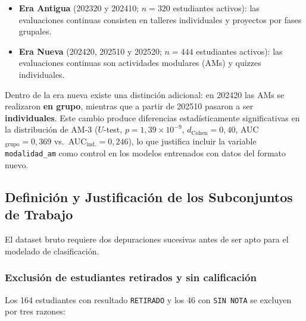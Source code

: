\begin{itemize}
  \item \textbf{Era Antigua} (202320 y 202410; $n = 320$ estudiantes
    activos): las evaluaciones continuas consisten en talleres
    individuales y proyectos por fases grupales.

  \item \textbf{Era Nueva} (202420, 202510 y 202520; $n = 444$
    estudiantes activos): las evaluaciones continuas son
    actividades modulares (AMs) y quizzes individuales.
\end{itemize}

Dentro de la era nueva existe una distinción adicional: en
202420 las AMs se realizaron \textbf{en grupo}, mientras que
a partir de 202510 pasaron a ser \textbf{individuales}. Este
cambio produce diferencias estadísticamente significativas en la
distribución de AM-3 ($U$-test, $p = 1{,}39 \times 10^{-9}$,
$d_{\text{Cohen}} = 0{,}40$, AUC$_{\text{grupo}} = 0{,}369$
vs.\ AUC$_{\text{ind.}} = 0{,}246$), lo que justifica incluir la
variable \texttt{modalidad\_am} como control en los modelos
entrenados con datos del formato nuevo.

\subsection{Definición y Justificación de los Subconjuntos
            de Trabajo}
\label{subsec:subsets}

El dataset bruto requiere dos depuraciones sucesivas antes de
ser apto para el modelado de clasificación.

\subsubsection{Exclusión de estudiantes retirados y sin
               calificación}
\label{sssec:excl_retirados}

Los 164 estudiantes con resultado \texttt{RETIRADO} y los
46 con \texttt{SIN~NOTA} se excluyen por tres razones:

